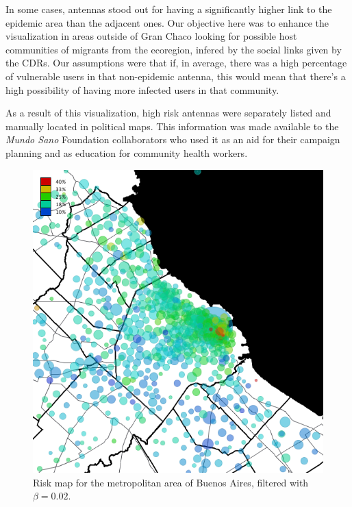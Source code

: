 In some cases, antennas stood out for having a significantly higher link to the epidemic area than the adjacent ones. Our objective here was to enhance the visualization in areas outside of Gran Chaco looking for possible host communities of migrants from the ecoregion, infered by the social links given by the CDRs. Our assumptions were that if, in average, there was a high percentage of vulnerable users in that non-epidemic antenna, this would mean that there's a high possibility of having more infected users in that community.

As a result of this visualization, high risk antennas were separately listed and manually located in political maps. This information was made available to the \textit{Mundo Sano} Foundation collaborators who used it as an aid for their campaign planning and as education for community health workers.


\begin{figure}[p]
	\caption{Risk map for the metropolitan area of Buenos Aires, filtered with $\beta = 0.02$.}
	\label{fig:amba_map}
	\centering
	\includegraphics[width=0.75\linewidth]
	{figures/201112_hi_res_amba_usuarios_proporcion_circulos_beta2/201112_hi_res_amba_usuarios_proporcion_circulos_beta2}
\end{figure}


